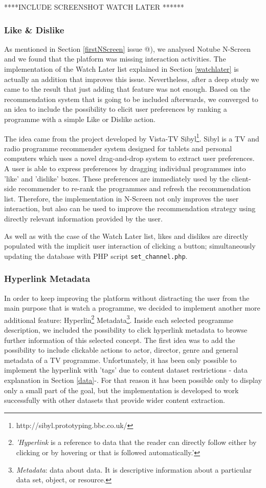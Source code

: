 \documentclass{acm_proc_article-sp}
\makeatletter
\newcommand*{\rom}[1]{\expandafter\@slowromancap\romannumeral #1@}
\makeatother
\begin{document}
****INCLUDE SCREENSHOT WATCH LATER ******

\subsubsection{Like \& Dislike}
As mentioned in Section \ref{firstNScreen} issue \rom{3}), we analysed Notube N-Screen and we found that the platform was missing interaction activities. The implementation of the Watch Later list explained in Section \ref{watchlater} is  actually an addition that improves this issue. Nevertheless, after a deep study we came to the result that just adding that feature was not enough. Based on the recommendation system that is going to be included afterwards, we converged to an idea to include the possibility to elicit user preferences by ranking a programme with a simple Like or Dislike action. 

The idea came from the project developed by Vista-TV Sibyl\footnote{http://sibyl.prototyping.bbc.co.uk/}. Sibyl is a TV and radio programme recommender system designed for tablets and personal computers which uses a novel drag-and-drop system to extract user preferences. A user is able to express preferences by dragging individual programmes into 'like' and 'dislike' boxes. These preferences are immediately used by the client-side recommender to re-rank the programmes and refresh the recommendation list. Therefore, the implementation in N-Screen not only improves the user interaction, but also can be used to improve the recommendation strategy using directly relevant information provided by the user. 

As well as with the case of the Watch Later list, likes and dislikes are directly populated with the implicit user interaction of clicking a button; simultaneously updating the database with PHP script \texttt{set\_channel.php}. 

\subsubsection{Hyperlink Metadata}

In order to keep improving the platform without distracting the user from the main purpose\cite{allen2012smashing} that is watch a programme, we decided to implement another more additional feature: Hyperlin\cite{wiki:hyper}\footnote{\textit{'Hyperlink} is a reference to data that the reader can directly follow either by clicking or by hovering or that is followed automatically.'} Metadata\footnote{\textit{Metadata}: data about data. It is descriptive information about a particular data set, object, or resource.}. Inside each selected programme description, we included the possibility to click hyperlink metadata to browse further information of this selected concept. The first idea was to add the possibility to include clickable actions to actor, director, genre and general metadata of a TV programme. Unfortunately, it has been only possible to implement the hyperlink with 'tags'  due to content dataset restrictions - data explanation in Section \ref{data}-. For that reason it has been possible only to display only a small part of the goal, but the implementation is developed to work successfully with other datasets that provide wider content extraction.
\end{document}
